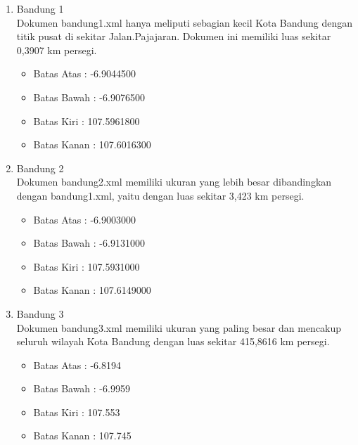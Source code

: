 \begin{enumerate}
  \item Bandung 1 \\
  Dokumen bandung1.xml hanya meliputi sebagian kecil Kota Bandung dengan titik
  pusat di sekitar Jalan.Pajajaran. Dokumen ini memiliki luas sekitar 0,3907 km
  persegi.
  \begin{itemize}
    \item Batas Atas : -6.9044500
    
    \item Batas Bawah : -6.9076500
    
    \item Batas Kiri : 107.5961800
    
    \item Batas Kanan : 107.6016300
  \end{itemize}

  \item Bandung 2 \\
  Dokumen bandung2.xml memiliki ukuran yang lebih besar dibandingkan dengan
  bandung1.xml, yaitu dengan luas sekitar 3,423 km persegi.
  \begin{itemize}
    \item Batas Atas : -6.9003000
    
    \item Batas Bawah : -6.9131000
    
    \item Batas Kiri : 107.5931000
    
    \item Batas Kanan : 107.6149000
  \end{itemize}
  
  \item Bandung 3 \\
  Dokumen bandung3.xml memiliki ukuran yang paling besar dan mencakup seluruh
  wilayah Kota Bandung dengan luas sekitar 415,8616 km persegi.
  \begin{itemize}
    \item Batas Atas : -6.8194
    
    \item Batas Bawah : -6.9959
    
    \item Batas Kiri : 107.553
    
    \item Batas Kanan : 107.745
  \end{itemize}
\end{enumerate}


